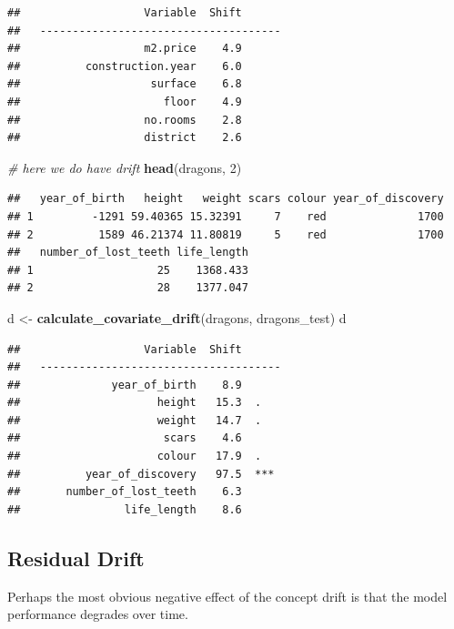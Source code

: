 \documentclass[12pt,]{krantz}
\newenvironment{Shaded}{\begin{snugshade}}{\end{snugshade}}
\newcommand{\CommentTok}[1]{\textcolor[rgb]{0.56,0.35,0.01}{\textit{#1}}}
\newcommand{\DecValTok}[1]{\textcolor[rgb]{0.00,0.00,0.81}{#1}}
\newcommand{\KeywordTok}[1]{\textcolor[rgb]{0.13,0.29,0.53}{\textbf{#1}}}
\newcommand{\NormalTok}[1]{#1}
\newcommand{\StringTok}[1]{\textcolor[rgb]{0.31,0.60,0.02}{#1}}
\theoremstyle{definition}
\theoremstyle{definition}
\theoremstyle{definition}
\theoremstyle{remark}
\begin{document}
\begin{verbatim}
##                   Variable  Shift
##   -------------------------------------
##                   m2.price    4.9  
##          construction.year    6.0  
##                    surface    6.8  
##                      floor    4.9  
##                   no.rooms    2.8  
##                   district    2.6
\end{verbatim}

\begin{Shaded}
\begin{Highlighting}[]
\CommentTok{# here we do have drift}
\KeywordTok{head}\NormalTok{(dragons, }\DecValTok{2}\NormalTok{)}
\end{Highlighting}
\end{Shaded}

\begin{verbatim}
##   year_of_birth   height   weight scars colour year_of_discovery
## 1         -1291 59.40365 15.32391     7    red              1700
## 2          1589 46.21374 11.80819     5    red              1700
##   number_of_lost_teeth life_length
## 1                   25    1368.433
## 2                   28    1377.047
\end{verbatim}

\begin{Shaded}
\begin{Highlighting}[]
\NormalTok{d <-}\StringTok{ }\KeywordTok{calculate_covariate_drift}\NormalTok{(dragons, dragons_test)}
\NormalTok{d}
\end{Highlighting}
\end{Shaded}

\begin{verbatim}
##                   Variable  Shift
##   -------------------------------------
##              year_of_birth    8.9  
##                     height   15.3  .
##                     weight   14.7  .
##                      scars    4.6  
##                     colour   17.9  .
##          year_of_discovery   97.5  ***
##       number_of_lost_teeth    6.3  
##                life_length    8.6
\end{verbatim}

\hypertarget{residual-drift}{%
\subsection{Residual Drift}\label{residual-drift}}

Perhaps the most obvious negative effect of the concept drift is that
the model performance degrades over time.
\end{document}
